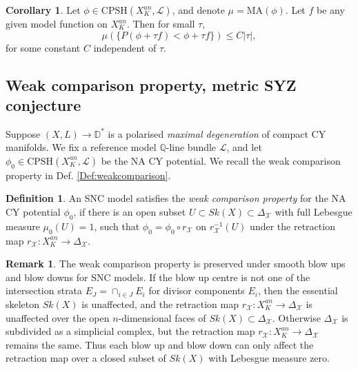 \documentclass[a4paper]{article}
\theoremstyle{definition}
\newtheorem{cor}[thm]{Corollary}
\newtheorem{rmk}[thm]{Remark}
\newtheorem{Def}[thm]{Definition}
\newcommand{\Q}{\mathbb{Q}}
\begin{document}
	\begin{cor}\label{cor:orthogonality}
	\cite[proof of Cor. 7.3]{Boucksom}  Let $\phi\in \text{CPSH}(X_K^{an}, \mathcal{L})$, and denote $\mu= \text{MA}(\phi)$. Let $f$ be any given model function on $X_K^{an}$. Then for small $\tau$, 
	\[
	\mu( \{      P(\phi+\tau f) <  \phi+\tau  f        \}   ) \leq C |\tau|,
	\]
for some constant $C$ independent of $\tau$. 
	\end{cor}
	
	
	
	
	
	
	
	
	

	
	
	
\subsection{Weak comparison property, metric SYZ conjecture}\label{sec:comparisonproperty}





Suppose $(X,L)\to \mathbb{D}^*$ is a polarised \emph{maximal degeneration} of compact CY manifolds. We fix a reference model $\Q$-line bundle $\mathcal{L}$, and let $\phi_0\in  \text{CPSH}(X_K^{an}, \mathcal{L})$ be the NA CY potential.
We recall the weak comparison property in Def. \ref{Def:weakcomparison}.



		\begin{Def}
	An SNC model satisfies the \emph{weak comparison property} for the NA CY potential $\phi_0$, if there is an open subset $U\subset Sk(X)\subset  \Delta_{\mathcal{X}}$ with full Lebesgue measure $\mu_0(U)=1$, such that $\phi_0 =\phi_0\circ r_{\mathcal{X}} $ on $r_\mathcal{X}^{-1}(U)$ under the retraction map $r_{\mathcal{X}}: X_K^{an}\to \Delta_{\mathcal{X}}$.
\end{Def}



\begin{rmk}\label{rmk:blowup}
	The weak comparison property is preserved under smooth blow ups and blow downs for SNC models. If the blow up centre is not one of the intersection strata $E_J=\cap_{i\in J} E_i$ for divisor components $E_i$, then the essential skeleton $Sk(X)$ is unaffected, and the retraction map $r_{\mathcal{X}}: X_K^{an}\to \Delta_{\mathcal{X}}$ is unaffected over the open $n$-dimensional faces of $Sk(X)\subset \Delta_{\mathcal{X}}$. 
Otherwise $\Delta_{\mathcal{X}}$ is subdivided as a simplicial complex, but the retraction map $r_{\mathcal{X}}: X_K^{an}\to \Delta_{\mathcal{X}}$ remains the same. Thus each blow up and blow down can only affect the retraction map over a closed subset of $Sk(X)$ with Lebesgue measure zero.
\end{rmk}
\end{document}
